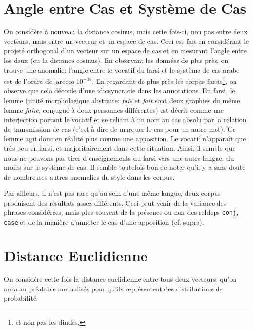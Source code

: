 \documentclass{cours}
\begin{document}
    \section{Angle entre Cas et Système de Cas}
    On considère à nouveau la distance cosinus, mais cette fois-ci, non pas entre deux vecteurs, mais entre un vecteur et un espace de cas.
    Ceci est fait en considérant le projeté orthogonal d'un vecteur sur un espace de cas et en mesurant l'angle entre les deux (ou la distance cosinus).
    En observant les données de plus près, on trouve une anomalie: l'angle entre le vocatif du farsi et le système de cas arabe est de l'ordre de $\arccos{10^{-16}}$.
    En regardant de plus près les corpus farsis\footnote{et non pas les dindes.}, on observe que cela découle d'une idiosyncracie dans les annotations.
    En farsi, le lemme (unité morphologique abstraite: \textsl{fais} et \textsl{fait} sont deux graphies du même lemme \textsl{faire}, conjugué à deux personnes différentes)
    est décrit comme une interjection portant le vocatif et se reliant à un nom au cas absolu par la relation de transmission de cas (c'est à dire de marquer le cas pour un autre mot).
    Ce lemme agit donc en réalité plus comme une apposition.
    Le vocatif n'apparaît que très peu en farsi, et majoritairement dans cette situation.
    Ainsi, il semble que nous ne pouvons pas tirer d'enseignements du farsi vers une autre langue, du moins sur le système de cas.
    Il semble toutefois bon de noter qu'il y a sans doute de nombreuses autres anomalies du style dans les corpus.

    Par ailleurs, il n'est pas rare qu'au sein d'une même langue, deux corpus produisent des résultats assez différents. Ceci peut venir de la variance des phrases considérées, mais plus souvent de la présence ou non des reldeps \texttt{conj, case} et de la manière d'annoter le cas d'une apposition (cf. supra).

    \section{Distance Euclidienne}
    On considère cette fois la distance euclidienne entre tous deux vecteurs, qu'on aura au préalable normalisés pour qu'ils représentent des distributions de probabilité.

    
\end{document}
